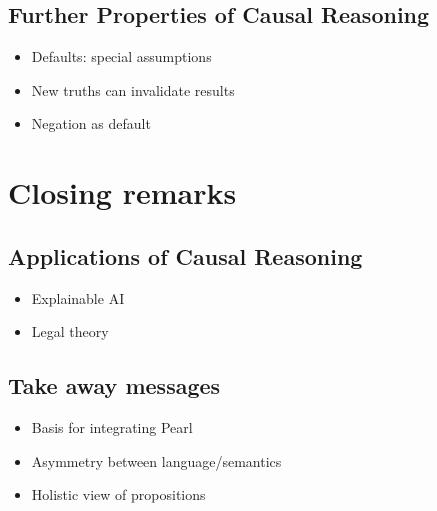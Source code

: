\documentclass[seminar,palatino,english]{AIGpaper}
\begin{document}
\subsection{Further Properties of Causal Reasoning}
\begin{itemize}
     \item Defaults: special assumptions
    \item New truths can invalidate results
    \item Negation as default
\end{itemize}

\section{Closing remarks}
\subsection{Applications of Causal Reasoning}
\begin{itemize}
    \item Explainable AI
    \item Legal theory
\end{itemize}

\subsection{Take away messages}
\begin{itemize}
    \item Basis for integrating Pearl
    \item Asymmetry between language/semantics
    \item Holistic view of propositions
\end{itemize}



{\footnotesize
    \printbibliography
}

\end{document}
